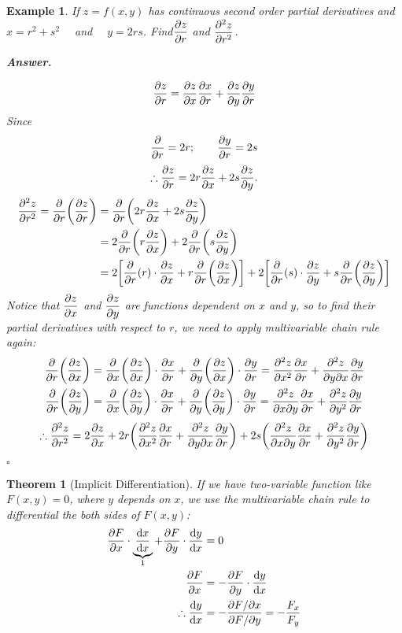 \documentclass[12pt,a4paper]{article}
\newtheorem{thm}{Theorem}[subsection]
\newtheorem{eg}{Example}[subsection]
\newenvironment*{ans}{\par\indent\textbf{\textit{Answer. }}\par}{\par\hfill{$\square$}\par}
\def\dsst{\displaystyle}
\def\d{{\mathrm{d}}}
\def\dydx{\dsst\frac{\d y}{\d x}}
\def\dx{\d x}
\def\del{\partial}
\begin{document}
\begin{eg}
	If $z=f(x,y)$ has continuous second order partial derivatives and $x=r^2+s^2\quad$ and $\quad y=2rs$. Find$\displaystyle\pdv{z}{r}$ and $\displaystyle\pdv[2]{z}{r}$.
	\begin{ans}
		\[\pdv{z}{r}=\pdv{z}{x}\pdv{x}{r}+\pdv{z}{y}\pdv{y}{r}\] Since \[\pdv{}{r}=2r;\qquad\pdv{y}{r}=2s\]\[\therefore\pdv{z}{r}=2r\pdv{z}{x}+2s\pdv{z}{y}.\]\[\begin{aligned}\pdv[2]{z}{r}=\pdv{}{r}\qty(\pdv{z}{r})&=\pdv{}{r}\qty(2r\pdv{z}{x}+2s\pdv{z}{y})\\&=2\pdv{}{r}\qty(r\pdv{z}{x})+2\pdv{}{r}\qty(s\pdv{z}{y})\\&=2\qty[\pdv{}{r}\qty(r)\cdot\pdv{z}{x}+r\pdv{}{r}\qty(\pdv{z}{x})]+2\qty[\pdv{}{r}\qty(s)\cdot\pdv{z}{y}+s\pdv{}{r}\qty(\pdv{z}{y})]\end{aligned}\] Notice that $\displaystyle\pdv{z}{x}$ and $\displaystyle\pdv{z}{y}$ are functions dependent on $x$ and $y$, so to find their partial derivatives with respect to $r$, we need to apply multivariable chain rule again: \[\begin{aligned}\pdv{}{r}\qty(\pdv{z}{x})&=\pdv{}{x}\qty(\pdv{z}{x})\cdot\pdv{x}{r}+\pdv{}{y}\qty(\pdv{z}{x})\cdot\pdv{y}{r}=\pdv[2]{z}{x}\pdv{x}{r}+\pdv{z}{y}{x}\pdv{y}{r}\\\pdv{}{r}\qty(\pdv{z}{y})&=\pdv{}{x}\qty(\pdv{z}{y})\cdot\pdv{x}{r}+\pdv{}{y}\qty(\pdv{z}{y})\cdot\pdv{y}{r}=\pdv{z}{x}{y}\pdv{x}{r}+\pdv[2]{z}{y}\pdv{y}{r}\end{aligned}\]\[\therefore\pdv[2]{z}{r}=2\pdv{z}{x}+2r\qty(\pdv[2]{z}{x}\pdv{x}{r}+\pdv{z}{y}{x}\pdv{y}{r})+2s\qty(\pdv{z}{x}{y}\pdv{x}{r}+\pdv[2]{z}{y}\pdv{y}{r})\]
	\end{ans}
\end{eg}
\begin{thm}[Implicit Differentiation]
	If we have two-variable function like $F(x,y)=0$, where $y$ depends on $x$, we use the multivariable chain rule to differential the both sides of $F(x,y)$:
	\[\begin{aligned}\pdv{F}{x}\cdot\underbrace{\frac{\dx}{\dx}}_{1}+\pdv{F}{y}\cdot\dydx&=0\\\pdv{F}{x}&=-\pdv{F}{y}\cdot\dydx\\\therefore\dydx&=-\frac{{\del F}/{\del x}}{{\del F}/{\del y}}=-\frac{F_x}{F_y}\end{aligned}\]	
\end{thm}
\end{document}
